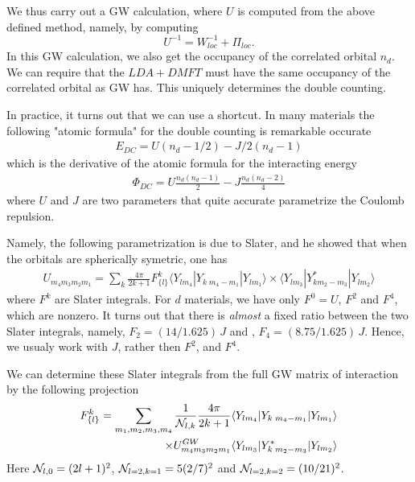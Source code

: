 \documentclass[usenames,letter,landscape,semhelv]{seminar}
\begin{document}
\begin{slide}
We thus carry out a GW calculation, where $U$ is computed from the
above defined method, namely, by computing
\begin{equation}
U^{-1} = W_{loc}^{-1}+\Pi_{loc}.
\end{equation}
In this GW calculation, we also get the occupancy of the correlated
orbital $n_d$. We can require that the $LDA+DMFT$ must have the same
occupancy of the correlated orbital as GW has. This uniquely
determines the double counting.


In practice, it turns out that we can use a shortcut. In many
materials the following "atomic formula" for the double counting is
remarkable occurate
\begin{eqnarray}
E_{DC} = U(n_d-1/2) - J/2(n_d-1)
\end{eqnarray}
which is the derivative of the atomic formula for the interacting energy
\begin{eqnarray}
\Phi_{DC} = U \frac{n_d (n_d-1)}{2} - J \frac{n_d(n_d-2)}{4}
\end{eqnarray}
where $U$ and $J$ are two parameters that quite accurate parametrize
the Coulomb repulsion.

Namely, the following parametrization is due to Slater, and he showed
that when the orbitals are spherically symetric, one has
\begin{eqnarray}
U_{m_4 m_3 m_2 m_1} = \sum_k \frac{4\pi}{2k+1} F^k_{\{l\}}
\langle Y_{l m_4}|Y_{k\; m_4-m_1}|Y_{l m_1}\rangle %
\times \langle Y_{l m_3}|Y^*_{k m_2-m_3}|Y_{l m_2}\rangle
\end{eqnarray}
where $F^k$ are Slater integrals. For $d$ materials, we have only
$F^0=U$, $F^2$ and $F^4$, which are nonzero. It turns out that there
is \textit{almost} a fixed ratio between the two Slater integrals, namely,
$F_2= (14/1.625)\, J$
and ,
$F_4 =(8.75/1.625)\, J$. Hence, we usualy work with $J$,
rather then $F^2$, and $F^4$.

We can determine these Slater integrals from the full GW matrix of
interaction by the following projection
\begin{eqnarray}
F^k_{\{l\}} = \sum_{m_1,m_2,m_3,m_4}\frac{1}
{{\cal N}_{l,k}}\frac{4\pi}{2k+1}
\langle Y_{l m_4}|Y_{k\; m_4-m_1}|Y_{l m_1}\rangle\nonumber\\
\times U^{GW}_{m_4 m_3 m_2 m_1}
\langle Y_{l m_3}|Y^*_{k\; m_2-m_3}|Y_{l m_2}\rangle
\end{eqnarray}
Here ${\cal N}_{l,0}=(2l+1)^2$, ${\cal N}_{l=2,k=1}=5(2/7)^2$ and
${\cal N}_{l=2,k=2}=(10/21)^2$.



\end{slide}
\end{document}
